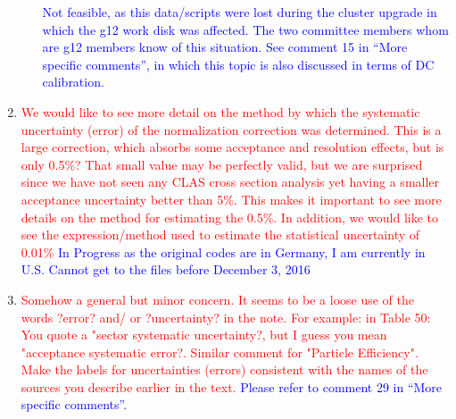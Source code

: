 \documentclass[11pt,a4paper]{article}
\begin{document}
\begin{enumerate}
\begin{enumerate}
\textcolor{blue}{Not feasible, as this data/scripts were lost during the cluster upgrade in which the g12 work disk was affected. The two committee members whom are g12 members know of this situation. See comment 15 in ``More specific comments'', in which this topic is also discussed in terms of DC calibration.}
\end{enumerate}
\item
\textcolor{red}{We would like to see more detail on the method by which the systematic uncertainty (error) of the normalization correction was determined. This is a large correction, which absorbs some acceptance and resolution effects, but is only 0.5\%? That small value may be perfectly valid, but we are surprised since we have not seen any CLAS cross section analysis yet having a smaller acceptance uncertainty better than 5\%. This makes it important to see more details on the method for estimating the 0.5\%. In addition, we would like to see the expression/method used to estimate the statistical uncertainty of 0.01\%}
\textcolor{blue}{In Progress as the original codes are in Germany, I am currently in U.S. Cannot get to the files before December 3, 2016}
\item
\textcolor{red}{Somehow a general but minor concern. It seems to be a loose use of the words ?error? and/ or ?uncertainty? in the note. For example: in Table 50: You quote a "sector systematic uncertainty?, but I guess you mean "acceptance systematic error?. Similar comment for "Particle Efficiency". Make the labels for uncertainties (errors) consistent with the names of the sources you describe earlier in the text.}
\textcolor{blue}{Please refer to comment 29 in ``More specific comments''.}
\end{enumerate}
\end{document}
